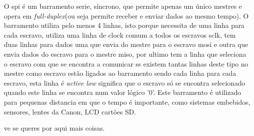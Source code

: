 O \acrlong{spi} é um barramento serie, síncrono, que permite apenas um único mestres e opera em \textit{full-duplex}(ou seja permite receber e enviar dados ao mesmo tempo). O barramento utiliza pelo menos 4 linhas, isto porque necessita de uma linha para cada escravo, utiliza uma linha de clock comum a todos os escravos \acrlong{sclk}, tem duas linhas para dados uma que envia do mestre para o escravo \acrlong{mosi} e outra que envia dados do escravo para o mestre \acrlong{miso}, por ultimo tem a linha que seleciona o escravo com que se encontra a comunicar \acrlong{ss} existem tantas linhas deste tipo no mestre como escravo estão ligados ao barramento sendo cada linha para cada escravo, esta linha é \textit{active low} significa que o escravo só se encontra selecionado quando este linha se encontra num valor lógico '0'. Este barramento é utilizado para pequenas distancia em que o tempo é importante, como sistemas embebidos, sensores, lentes da Canon, LCD cartões SD.

ve se queres por aqui mais coisas.



